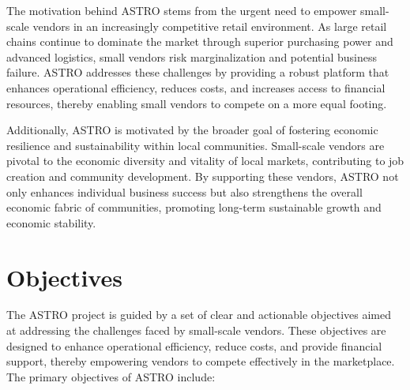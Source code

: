 The motivation behind ASTRO stems from the urgent need to empower small-scale vendors in an increasingly competitive retail environment. As large retail chains continue to dominate the market through superior purchasing power and advanced logistics, small vendors risk marginalization and potential business failure. ASTRO addresses these challenges by providing a robust platform that enhances operational efficiency, reduces costs, and increases access to financial resources, thereby enabling small vendors to compete on a more equal footing.

Additionally, ASTRO is motivated by the broader goal of fostering economic resilience and sustainability within local communities. Small-scale vendors are pivotal to the economic diversity and vitality of local markets, contributing to job creation and community development. By supporting these vendors, ASTRO not only enhances individual business success but also strengthens the overall economic fabric of communities, promoting long-term sustainable growth and economic stability.
	

	

	
	\section{Objectives}
	The ASTRO project is guided by a set of clear and actionable objectives aimed at addressing the challenges faced by small-scale vendors. These objectives are designed to enhance operational efficiency, reduce costs, and provide financial support, thereby empowering vendors to compete effectively in the marketplace. The primary objectives of ASTRO include:

